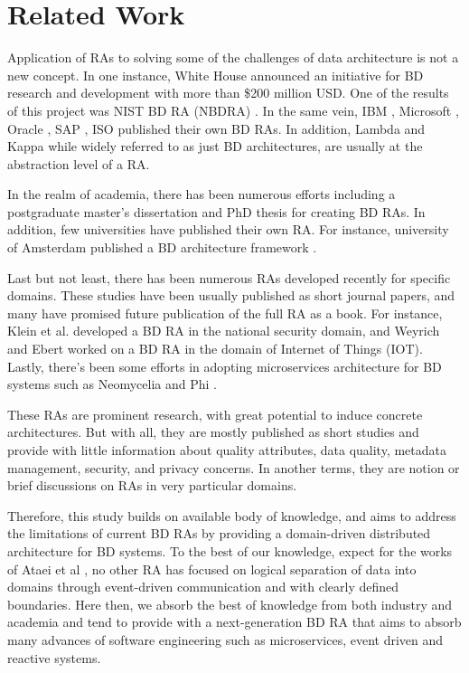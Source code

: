 \documentclass[conference]{IEEEtran}
\begin{document}
 

\section{Related Work}

Application of RAs to solving some of the challenges of data architecture is not a new concept. In one instance, White House announced an initiative for BD research and development with more than \$200 million USD. One of the results of this project was NIST BD RA (NBDRA) \cite{Chang}. In the same vein, IBM \cite{quintero2019ibm}, Microsoft \cite{levin2013big}, Oracle \cite{cackett2013information}, SAP \cite{SAPRA}, ISO \cite{ISO20547} published their own BD RAs. In addition, Lambda \cite{kiran2015lambda} and Kappa \cite{lin2017lambda} while widely referred to as just BD architectures, are usually at the abstraction level of a RA.

In the realm of academia, there has been numerous efforts including a postgraduate master’s dissertation \cite{Maier} and PhD thesis \cite{suthakar2017scalable} for creating BD RAs. In addition, few universities have published their own RA. For instance, university of Amsterdam published a BD architecture framework \cite{framework2015draft}. 

Last but not least, there has been numerous RAs developed recently for specific domains. These studies have been usually published as short journal papers, and many have promised future publication of the full RA as a book. For instance, Klein et al. \cite{Klein} developed a BD RA in the national security domain, and Weyrich and Ebert \cite{weyrich2015reference} worked on a BD RA in the domain of Internet of Things (IOT). Lastly, there's been some efforts in adopting microservices architecture for BD systems such as Neomycelia \cite{AtaeiApsec} and Phi \cite{maamouri2021phi}.

These RAs are prominent research, with great potential to induce concrete architectures. But with all, they are mostly published as short studies and provide with little information about quality attributes, data quality, metadata management, security, and privacy concerns. In another terms, they are notion or brief discussions on RAs in very particular domains. 

Therefore, this study builds on available body of knowledge, and aims to address the limitations of current BD RAs by providing a domain-driven distributed architecture for BD systems. To the best of our knowledge, expect for the works of Ataei et al \cite{AtaeiApsec}, no other RA has focused on logical separation of data into domains through event-driven communication and with clearly defined boundaries. Here then, we absorb the best of knowledge from both industry and academia and tend to provide with a next-generation BD RA that aims to absorb many advances of software engineering such as microservices, event driven and reactive systems. 
\end{document}
